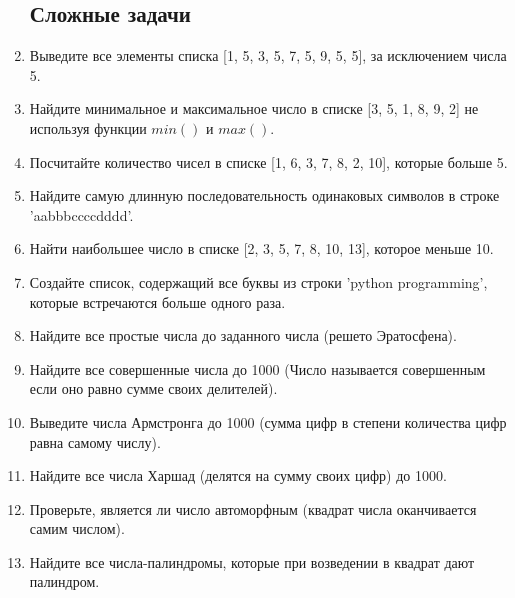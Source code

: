 \documentclass[a4,12pt]{article}
\theoremstyle{remark}
\begin{document}
\begin{enumerate}
    \subsection*{Сложные задачи}
    \item Выведите все элементы списка [1, 5, 3, 5, 7, 5, 9, 5, 5], за исключением числа 5.
    \item Найдите минимальное и максимальное число в списке [3, 5, 1, 8, 9, 2] не используя функции $min()$ и $max()$.
    \item Посчитайте количество чисел в списке [1, 6, 3, 7, 8, 2, 10], которые больше 5.
    \item Найдите самую длинную последовательность одинаковых символов в строке 'aabbbccccdddd'.
    \item Найти наибольшее число в списке [2, 3, 5, 7, 8, 10, 13], которое меньше 10.
    
    \item Создайте список, содержащий все буквы из строки 'python programming', которые встречаются больше одного раза.
    \item Найдите все простые числа до заданного числа (решето Эратосфена).
    \item Найдите все совершенные числа до 1000 (Число называется совершенным если оно равно сумме своих делителей).
    \item Выведите числа Армстронга до 1000 (сумма цифр в степени количества цифр равна самому числу).
    \item Найдите все числа Харшад (делятся на сумму своих цифр) до 1000.
    \item Проверьте, является ли число автоморфным (квадрат числа оканчивается самим числом).
    \item Найдите все числа-палиндромы, которые при возведении в квадрат дают палиндром.

\end{enumerate}
\end{document}

